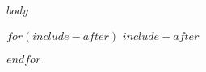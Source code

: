 \documentclass[12pt,article,oneside]{memoir}
\begin{document}
%


$body$



$for(include-after)$
$include-after$

$endfor$
\end{document}
